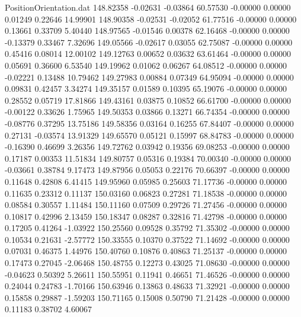 \begin{filecontents}{PositionOrientation.dat}
 148.82358   -0.02631   -0.03864    60.57530   -0.00000    0.00000    0.01249    0.22646   14.99901
 148.90358   -0.02531   -0.02052    61.77516   -0.00000    0.00000    0.13661    0.33709    5.40440
 148.97565   -0.01546    0.00378    62.16468   -0.00000    0.00000   -0.13379    0.33467    7.32696
 149.05566   -0.02617    0.03055    62.75087   -0.00000    0.00000    0.45416    0.08014   12.00102
 149.12763    0.00652    0.03632    63.61464   -0.00000    0.00000    0.05691    0.36600    6.53540
 149.19962    0.01062    0.06267    64.08512   -0.00000    0.00000   -0.02221    0.13488   10.79462
 149.27983    0.00884    0.07349    64.95094   -0.00000    0.00000    0.09831    0.42457    3.34274
 149.35157    0.01589    0.10395    65.19076   -0.00000    0.00000    0.28552    0.05719   17.81866
 149.43161    0.03875    0.10852    66.61700   -0.00000    0.00000   -0.00122    0.33626    1.75965
 149.50353    0.03866    0.13271    66.74354   -0.00000    0.00000   -0.08776    0.37295   13.75186
 149.58356    0.03164    0.16255    67.84407   -0.00000    0.00000    0.27131   -0.03574   13.91329
 149.65570    0.05121    0.15997    68.84783   -0.00000    0.00000   -0.16390    0.46699    3.26356
 149.72762    0.03942    0.19356    69.08253   -0.00000    0.00000    0.17187    0.00353   11.51834
 149.80757    0.05316    0.19384    70.00340   -0.00000    0.00000   -0.03661    0.38784    9.17473
 149.87956    0.05053    0.22176    70.66397   -0.00000    0.00000    0.11648    0.42808    6.41415
 149.95960    0.05985    0.25603    71.17736   -0.00000    0.00000    0.11635    0.23312    0.11137
 150.03160    0.06823    0.27281    71.18538   -0.00000    0.00000    0.08584    0.30557    1.11484
 150.11160    0.07509    0.29726    71.27456   -0.00000    0.00000    0.10817    0.42996    2.13459
 150.18347    0.08287    0.32816    71.42798   -0.00000    0.00000    0.17205    0.41264   -1.03922
 150.25560    0.09528    0.35792    71.35302   -0.00000    0.00000    0.10534    0.21631   -2.57772
 150.33555    0.10370    0.37522    71.14692   -0.00000    0.00000    0.07031    0.46375    1.44976
 150.40760    0.10876    0.40863    71.25137   -0.00000    0.00000    0.17473    0.27045   -2.06468
 150.48755    0.12273    0.43025    71.08630   -0.00000    0.00000   -0.04623    0.50392    5.26611
 150.55951    0.11941    0.46651    71.46526   -0.00000    0.00000    0.24044    0.24783   -1.70166
 150.63946    0.13863    0.48633    71.32921   -0.00000    0.00000    0.15858    0.29887   -1.59203
 150.71165    0.15008    0.50790    71.21428   -0.00000    0.00000    0.11183    0.38702    4.60067

\end{filecontents}
